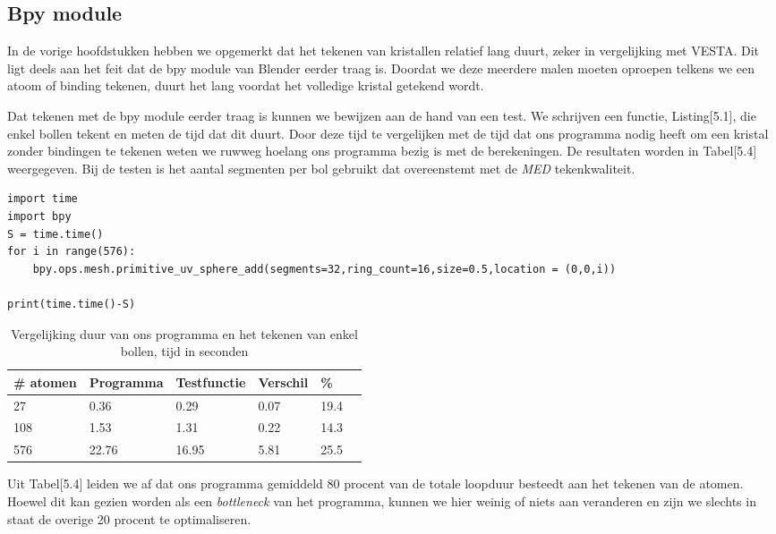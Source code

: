 \subsection{Bpy module}   
In de vorige hoofdstukken hebben we opgemerkt dat het tekenen van kristallen relatief lang duurt, zeker in vergelijking met VESTA. Dit ligt deels aan het feit dat de bpy module van Blender eerder traag is. Doordat we deze meerdere malen moeten oproepen telkens we een atoom of binding tekenen, duurt het lang voordat het volledige kristal getekend wordt.
\par
Dat tekenen met de bpy module eerder traag is kunnen we bewijzen aan de hand van een test. We schrijven een functie, Listing[5.1], die enkel bollen tekent en meten de tijd dat dit duurt. Door deze tijd te vergelijken met de tijd dat ons programma nodig heeft om een kristal zonder bindingen te tekenen weten we ruwweg hoelang ons programma bezig is met de berekeningen. De resultaten worden in Tabel[5.4] weergegeven. Bij de testen is het aantal segmenten per bol gebruikt dat overeenstemt met de \textit{MED} tekenkwaliteit.

\begin{lstlisting}[caption="Testprogramma dat een aantal bollen tekent en de duur meet"]
import time
import bpy
S = time.time()
for i in range(576):
    bpy.ops.mesh.primitive_uv_sphere_add(segments=32,ring_count=16,size=0.5,location = (0,0,i))
    
print(time.time()-S)
\end{lstlisting}

\begin{table}[H]
\caption{Vergelijking duur van ons programma en het tekenen van enkel bollen, tijd in seconden}
\begin{center}
\begin{tabular}{|l|l|l|l|l|l|}
\hline
\# atomen & Programma 	& Testfunctie	& Verschil & \%	\\ \hline
27  & 0.36    & 0.29 		& 0.07  	&	19.4 \\ \hline
108 & 1.53   	& 1.31 		& 0.22  	&	14.3 \\ \hline
576 & 22.76 	& 16.95 	& 5.81 		&	25.5 \\ \hline
\end{tabular}
\end{center}
\end{table}

Uit Tabel[5.4] leiden we af dat ons programma gemiddeld 80 procent van de totale loopduur besteedt aan het tekenen van de atomen. Hoewel dit kan gezien worden als een \textit{bottleneck} van het programma, kunnen we hier weinig of niets aan veranderen en zijn we slechts in staat de overige 20 procent te optimaliseren. 

